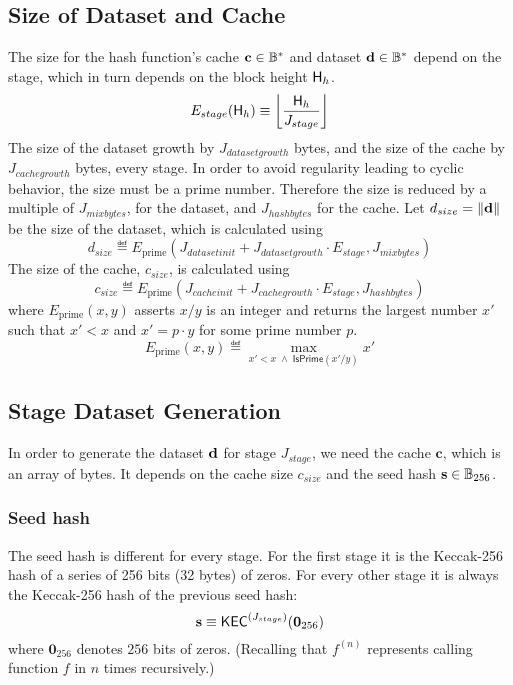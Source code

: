 \subsection{Size of Dataset and Cache}
The size for the hash function's cache $\mathbf{c} \in \mathbb{B}^*$  and dataset $\mathbf{d} \in \mathbb{B}^*$ depend on the stage, which in turn depends on the block height $\textsf{H}_{h}$.
\begin{equation} %
 E_{stage}(\head_{h}) \eqdef \left\lfloor\frac{\head_{h}}{J_{stage}}\right\rfloor
\end{equation}
The size of the dataset growth by $J_{datasetgrowth}$ bytes, and the size of the cache by $J_{cachegrowth}$ bytes, every stage. In order to avoid regularity leading to cyclic behavior, the size must be a prime number. Therefore the size is reduced by a multiple of $J_{mixbytes}$, for the dataset, and $J_{hashbytes}$ for the cache.
Let $d_{size} = \lVert\mathbf{d} \rVert$ be the size of the dataset, 
which is calculated using
\begin{equation}
 d_{size} \eqdef E_{\mathrm{prime}}(J_{datasetinit} + J_{datasetgrowth} \cdot E_{stage}, J_{mixbytes})
\end{equation}
The size of the cache, $c_{size}$, is calculated using
\begin{equation}
 c_{size} \eqdef E_{\mathrm{prime}}(J_{cacheinit} + J_{cachegrowth} \cdot E_{stage}, J_{hashbytes})
\end{equation}
where $E_{\mathrm{prime}}(x, y)$ asserts $x/y$ is an integer and returns the largest number $x'$ such that $x'<x$ and $x'=p\cdot y$ for some prime number $p$. 
\begin{equation}
	E_{\mathrm{prime}}(x, y) \eqdef \max_{x'<x\;\wedge\;\mathsf{IsPrime}(x'/y)} x'
\end{equation}
\subsection{Stage Dataset Generation}
In order to generate the dataset $\mathbf{d}$ for stage $J_{stage}$, we need the cache $\mathbf{c}$, which is an array of bytes. It depends on the cache size  $c_{size}$ and the seed hash $\mathbf{s} \in \mathbb{B}_{256}$.
\subsubsection{Seed hash}
The seed hash is different for every stage. For the first stage it is the Keccak-256 hash of a series of 256 bits (32 bytes) of zeros. For every other stage it is always the Keccak-256 hash of the previous seed hash:
\begin{equation}
 \mathbf{s} \equiv \mathsf{KEC}^{(J_{stage})}(\mathbf{0}_{256})
\end{equation}
where $\mathbf{0}_{256}$ denotes $256$ bits of zeros. (Recalling that $f^{(n)}$ represents calling function $f$ in $n$ times recursively.)

